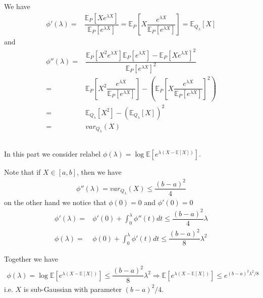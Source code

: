 \documentclass[11pt,a4paper]{ctexart}
\numberwithin{equation}{section}%
\begin{document}
\subsection{}
We have
\begin{align*}
    \phi'(\lambda )=&\dfrac{ \mathbb{E}_P\left[ Xe^{\lambda X} \right]  }{ \mathbb{E}_P\left[ e^{\lambda X} \right]  }  = \mathbb{E}_P\left[ X \dfrac{ e^{\lambda X} }{ \mathbb{E}_P\left[ e^{\lambda X} \right] }  \right] = \mathbb{E}_{Q_\lambda }\left[ X \right] 
\end{align*}
and
\begin{align*}
    \phi''(\lambda )=& \dfrac{ \mathbb{E}_P\left[ X^2e^{\lambda X} \right]\mathbb{E}_P\left[ e^{\lambda X} \right] - \mathbb{E}_P\left[ Xe^{\lambda X} \right]^2 }{ \mathbb{E}_P\left[ e^{\lambda X} \right] ^2 } \\
    =& \mathbb{E}_P\left[ X^2 \dfrac{ e^{\lambda X} }{ \mathbb{E}_P\left[ e^{\lambda X} \right] } \right] - \left( \mathbb{E}_P\left[ X \dfrac{ e^{\lambda X} }{ \mathbb{E}_P\left[ e^{\lambda X} \right] }  \right]^2 \right)\\
    =& \mathbb{E}_{Q_\lambda }\left[ X^2 \right] - \left( \mathbb{E}_{Q_\lambda }\left[ X \right] \right)^2\\
    =& var_{Q_\lambda }(X)
\end{align*}



\subsection{}

In this part we consider relabel $ \phi(\lambda ) = \log \mathbb{E}\left[ e^{\lambda (X-\mathbb{E}\left[ X \right] )} \right]  $.

Note that if $ X\in [a,b] $, then we have
\begin{align*}
    \phi''(\lambda ) = var_{Q_\lambda }(X) \leq \dfrac{ (b-a)^2 }{ 4 } 
\end{align*}
on the other hand we notice that $ \phi(0) = 0 $ and $ \phi'(0) = 0 $
\begin{align*}
    \phi'(\lambda )=& \phi'(0) + \int_0^\lambda \phi''(t)dt \leq  \dfrac{ (b-a)^2 }{ 4 } \lambda\\
    \phi(\lambda ) =& \phi(0) + \int_0^\lambda \phi'(t)dt \leq \dfrac{ (b-a)^2 }{ 8 } \lambda^2 
\end{align*}

Together we have
\begin{align*}
    \phi(\lambda ) = \log \mathbb{E}\left[ e^{\lambda (X-\mathbb{E}\left[ X \right] )} \right] \leq \dfrac{ (b-a)^2 }{ 8 } \lambda^2  \Rightarrow \mathbb{E}\left[ e^{\lambda (X-\mathbb{E}\left[ X \right] )} \right] \leq e^{(b-a)^2\lambda^2/8} 
\end{align*}
i.e. $ X $ is sub-Gaussian with parameter $ (b-a)^2/4 $.
\end{document}
